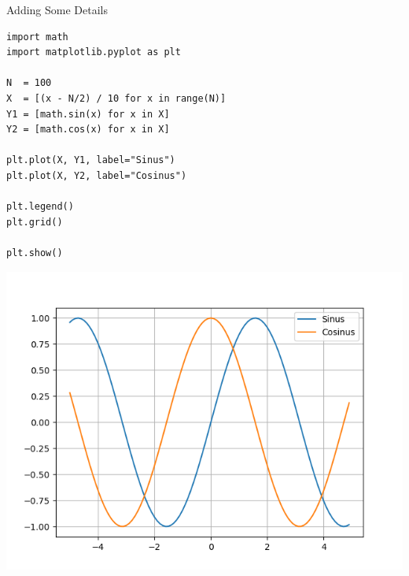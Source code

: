 \begin{frame}[fragile]{Adding Some Details}
%
\begin{codebox}[Example: Plot with Grid and Legend, width=.49\linewidth, nobeforeafter, equal height group = grpXmpGrid]
\begin{verbatim}
import math
import matplotlib.pyplot as plt

N  = 100
X  = [(x - N/2) / 10 for x in range(N)]
Y1 = [math.sin(x) for x in X]
Y2 = [math.cos(x) for x in X]

plt.plot(X, Y1, label="Sinus")
plt.plot(X, Y2, label="Cosinus")

plt.legend()
plt.grid()

plt.show()
\end{verbatim}
\end{codebox}
%
\begin{tcolorbox}[title=Output: Plot with Grid and Legend, width=.49\linewidth, nobeforeafter, equal height group = grpXmpGrid]
	\includegraphics[width=\linewidth]{./gfx/plt-grid}
\end{tcolorbox}
%
\end{frame}


